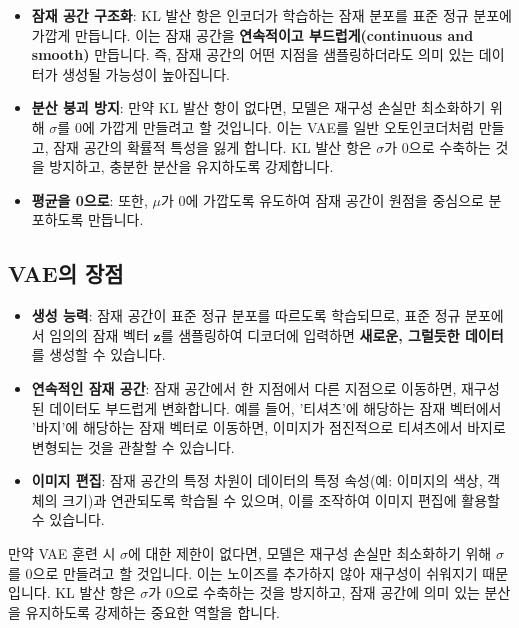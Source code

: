 \documentclass[11pt,a4paper]{article}
\begin{document}
\begin{tcolorbox}[title=\textbf{KL 발산 정규화의 역할}]
\begin{itemize}
    \item \textbf{잠재 공간 구조화}: KL 발산 항은 인코더가 학습하는 잠재 분포를 표준 정규 분포에 가깝게 만듭니다. 이는 잠재 공간을 \textbf{연속적이고 부드럽게(continuous and smooth)} 만듭니다. 즉, 잠재 공간의 어떤 지점을 샘플링하더라도 의미 있는 데이터가 생성될 가능성이 높아집니다.
    \item \textbf{분산 붕괴 방지}: 만약 KL 발산 항이 없다면, 모델은 재구성 손실만 최소화하기 위해 $\sigma$를 0에 가깝게 만들려고 할 것입니다. 이는 VAE를 일반 오토인코더처럼 만들고, 잠재 공간의 확률적 특성을 잃게 합니다. KL 발산 항은 $\sigma$가 0으로 수축하는 것을 방지하고, 충분한 분산을 유지하도록 강제합니다.
    \item \textbf{평균을 0으로}: 또한, $\mu$가 0에 가깝도록 유도하여 잠재 공간이 원점을 중심으로 분포하도록 만듭니다.
\end{itemize}
\end{tcolorbox}

\subsection{VAE의 장점}
\begin{itemize}
    \item \textbf{생성 능력}: 잠재 공간이 표준 정규 분포를 따르도록 학습되므로, 표준 정규 분포에서 임의의 잠재 벡터 $\mathbf{z}$를 샘플링하여 디코더에 입력하면 \textbf{새로운, 그럴듯한 데이터}를 생성할 수 있습니다.
    \item \textbf{연속적인 잠재 공간}: 잠재 공간에서 한 지점에서 다른 지점으로 이동하면, 재구성된 데이터도 부드럽게 변화합니다. 예를 들어, '티셔츠'에 해당하는 잠재 벡터에서 '바지'에 해당하는 잠재 벡터로 이동하면, 이미지가 점진적으로 티셔츠에서 바지로 변형되는 것을 관찰할 수 있습니다.
    \item \textbf{이미지 편집}: 잠재 공간의 특정 차원이 데이터의 특정 속성(예: 이미지의 색상, 객체의 크기)과 연관되도록 학습될 수 있으며, 이를 조작하여 이미지 편집에 활용할 수 있습니다.
\end{itemize}

\begin{warningbox}[시그마(분산) 붕괴 문제]
만약 VAE 훈련 시 $\sigma$에 대한 제한이 없다면, 모델은 재구성 손실만 최소화하기 위해 $\sigma$를 0으로 만들려고 할 것입니다. 이는 노이즈를 추가하지 않아 재구성이 쉬워지기 때문입니다. KL 발산 항은 $\sigma$가 0으로 수축하는 것을 방지하고, 잠재 공간에 의미 있는 분산을 유지하도록 강제하는 중요한 역할을 합니다.
\end{warningbox}
\end{document}
